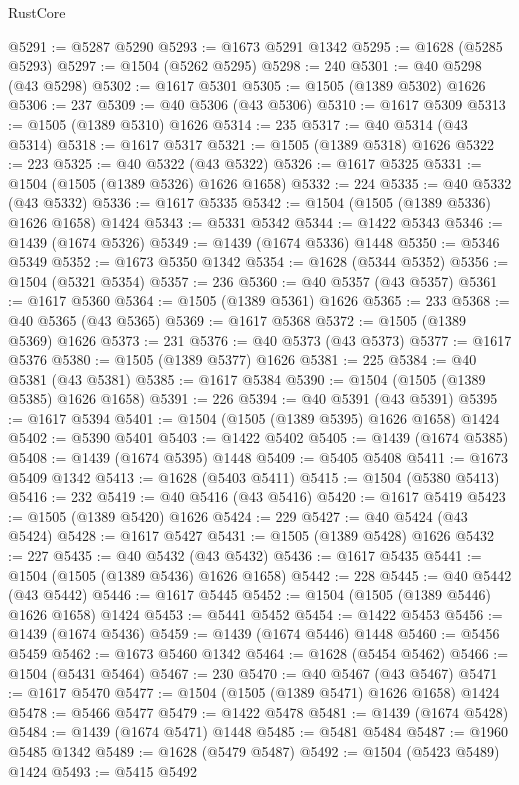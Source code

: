 \begin{lexlean}{RustCore}
\begin{coremodule}
@5291 := @5287 @5290
@5293 := @1673 @5291 @1342
@5295 := @1628 (@5285 @5293)
@5297 := @1504 (@5262 @5295)
@5298 := 240
@5301 := @40 @5298 (@43 @5298)
@5302 := @1617 @5301
@5305 := @1505 (@1389 @5302) @1626
@5306 := 237
@5309 := @40 @5306 (@43 @5306)
@5310 := @1617 @5309
@5313 := @1505 (@1389 @5310) @1626
@5314 := 235
@5317 := @40 @5314 (@43 @5314)
@5318 := @1617 @5317
@5321 := @1505 (@1389 @5318) @1626
@5322 := 223
@5325 := @40 @5322 (@43 @5322)
@5326 := @1617 @5325
@5331 := @1504 (@1505 (@1389 @5326) @1626 @1658)
@5332 := 224
@5335 := @40 @5332 (@43 @5332)
@5336 := @1617 @5335
@5342 := @1504 (@1505 (@1389 @5336) @1626 @1658) @1424
@5343 := @5331 @5342
@5344 := @1422 @5343
@5346 := @1439 (@1674 @5326)
@5349 := @1439 (@1674 @5336) @1448
@5350 := @5346 @5349
@5352 := @1673 @5350 @1342
@5354 := @1628 (@5344 @5352)
@5356 := @1504 (@5321 @5354)
@5357 := 236
@5360 := @40 @5357 (@43 @5357)
@5361 := @1617 @5360
@5364 := @1505 (@1389 @5361) @1626
@5365 := 233
@5368 := @40 @5365 (@43 @5365)
@5369 := @1617 @5368
@5372 := @1505 (@1389 @5369) @1626
@5373 := 231
@5376 := @40 @5373 (@43 @5373)
@5377 := @1617 @5376
@5380 := @1505 (@1389 @5377) @1626
@5381 := 225
@5384 := @40 @5381 (@43 @5381)
@5385 := @1617 @5384
@5390 := @1504 (@1505 (@1389 @5385) @1626 @1658)
@5391 := 226
@5394 := @40 @5391 (@43 @5391)
@5395 := @1617 @5394
@5401 := @1504 (@1505 (@1389 @5395) @1626 @1658) @1424
@5402 := @5390 @5401
@5403 := @1422 @5402
@5405 := @1439 (@1674 @5385)
@5408 := @1439 (@1674 @5395) @1448
@5409 := @5405 @5408
@5411 := @1673 @5409 @1342
@5413 := @1628 (@5403 @5411)
@5415 := @1504 (@5380 @5413)
@5416 := 232
@5419 := @40 @5416 (@43 @5416)
@5420 := @1617 @5419
@5423 := @1505 (@1389 @5420) @1626
@5424 := 229
@5427 := @40 @5424 (@43 @5424)
@5428 := @1617 @5427
@5431 := @1505 (@1389 @5428) @1626
@5432 := 227
@5435 := @40 @5432 (@43 @5432)
@5436 := @1617 @5435
@5441 := @1504 (@1505 (@1389 @5436) @1626 @1658)
@5442 := 228
@5445 := @40 @5442 (@43 @5442)
@5446 := @1617 @5445
@5452 := @1504 (@1505 (@1389 @5446) @1626 @1658) @1424
@5453 := @5441 @5452
@5454 := @1422 @5453
@5456 := @1439 (@1674 @5436)
@5459 := @1439 (@1674 @5446) @1448
@5460 := @5456 @5459
@5462 := @1673 @5460 @1342
@5464 := @1628 (@5454 @5462)
@5466 := @1504 (@5431 @5464)
@5467 := 230
@5470 := @40 @5467 (@43 @5467)
@5471 := @1617 @5470
@5477 := @1504 (@1505 (@1389 @5471) @1626 @1658) @1424
@5478 := @5466 @5477
@5479 := @1422 @5478
@5481 := @1439 (@1674 @5428)
@5484 := @1439 (@1674 @5471) @1448
@5485 := @5481 @5484
@5487 := @1960 @5485 @1342
@5489 := @1628 (@5479 @5487)
@5492 := @1504 (@5423 @5489) @1424
@5493 := @5415 @5492

\end{coremodule}
\end{lexlean}
